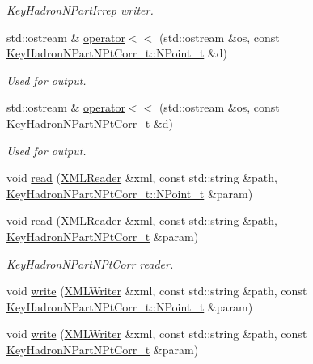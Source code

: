 \begin{DoxyCompactItemize}
\begin{DoxyCompactList}\small\item\em Key\+Hadron\+N\+Part\+Irrep writer. \end{DoxyCompactList}\item 
std\+::ostream \& \mbox{\hyperlink{namespaceHadron_aa96f2bb0448730889b5e59a58a1a62dd}{operator$<$$<$}} (std\+::ostream \&os, const \mbox{\hyperlink{structHadron_1_1KeyHadronNPartNPtCorr__t_1_1NPoint__t}{Key\+Hadron\+N\+Part\+N\+Pt\+Corr\+\_\+t\+::\+N\+Point\+\_\+t}} \&d)
\begin{DoxyCompactList}\small\item\em Used for output. \end{DoxyCompactList}\item 
std\+::ostream \& \mbox{\hyperlink{namespaceHadron_aa874bbfadc5859a87766ccbd07b10f48}{operator$<$$<$}} (std\+::ostream \&os, const \mbox{\hyperlink{structHadron_1_1KeyHadronNPartNPtCorr__t}{Key\+Hadron\+N\+Part\+N\+Pt\+Corr\+\_\+t}} \&d)
\begin{DoxyCompactList}\small\item\em Used for output. \end{DoxyCompactList}\item 
void \mbox{\hyperlink{namespaceHadron_aef0c0dfd0f87842b485511132f1c405f}{read}} (\mbox{\hyperlink{classADATXML_1_1XMLReader}{X\+M\+L\+Reader}} \&xml, const std\+::string \&path, \mbox{\hyperlink{structHadron_1_1KeyHadronNPartNPtCorr__t_1_1NPoint__t}{Key\+Hadron\+N\+Part\+N\+Pt\+Corr\+\_\+t\+::\+N\+Point\+\_\+t}} \&param)
\item 
void \mbox{\hyperlink{namespaceHadron_a85b27e940a60880e6f98fb6a939d96c2}{read}} (\mbox{\hyperlink{classADATXML_1_1XMLReader}{X\+M\+L\+Reader}} \&xml, const std\+::string \&path, \mbox{\hyperlink{structHadron_1_1KeyHadronNPartNPtCorr__t}{Key\+Hadron\+N\+Part\+N\+Pt\+Corr\+\_\+t}} \&param)
\begin{DoxyCompactList}\small\item\em Key\+Hadron\+N\+Part\+N\+Pt\+Corr reader. \end{DoxyCompactList}\item 
void \mbox{\hyperlink{namespaceHadron_af4fede7daa1a73ae6be48e039292c692}{write}} (\mbox{\hyperlink{classADATXML_1_1XMLWriter}{X\+M\+L\+Writer}} \&xml, const std\+::string \&path, const \mbox{\hyperlink{structHadron_1_1KeyHadronNPartNPtCorr__t_1_1NPoint__t}{Key\+Hadron\+N\+Part\+N\+Pt\+Corr\+\_\+t\+::\+N\+Point\+\_\+t}} \&param)
\item 
void \mbox{\hyperlink{namespaceHadron_a295fddb7420012571f5b8115f2b25a97}{write}} (\mbox{\hyperlink{classADATXML_1_1XMLWriter}{X\+M\+L\+Writer}} \&xml, const std\+::string \&path, const \mbox{\hyperlink{structHadron_1_1KeyHadronNPartNPtCorr__t}{Key\+Hadron\+N\+Part\+N\+Pt\+Corr\+\_\+t}} \&param)

\end{DoxyCompactItemize}
